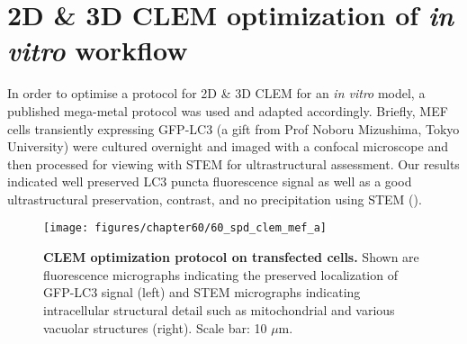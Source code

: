 \section{2D \& 3D CLEM optimization of \textit{in vitro} workflow}
In order to optimise a protocol for 2D \& 3D CLEM for an \textit{in vitro} model, a published mega-metal protocol was used \citep{Russell2017} and adapted accordingly. Briefly, MEF cells transiently expressing GFP-LC3 (a gift from Prof Noboru Mizushima, Tokyo University) were cultured overnight and imaged with a confocal microscope and then processed for viewing with STEM for ultrastructural assessment. Our results indicated well preserved LC3 puncta fluorescence signal as well as a good ultrastructural preservation, contrast, and no precipitation using STEM (). 

\begin{figure}[!htbp]
\centering
  \texttt{[image: figures/chapter60/60\_spd\_clem\_mef\_a]}
  \caption[CLEM optimization protocol on transfected cells]{\textbf{CLEM optimization protocol on transfected cells.} Shown are fluorescence micrographs indicating the preserved localization of GFP-LC3 signal (left) and STEM micrographs indicating intracellular structural detail such as mitochondrial and various vacuolar structures (right). Scale bar: 10 $\mu$m.}
  \label{fig:60_spd_clem_mef_a}
\end{figure} 

